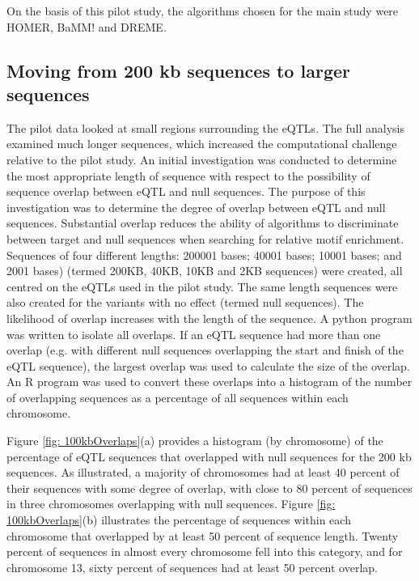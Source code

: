 \documentclass[12pt]{article}
\begin{document}
On the basis of this pilot study, the algorithms chosen for the main study were HOMER, BaMM! and DREME.


\subsection{Moving from 200 kb sequences to larger sequences}

The pilot data looked at small regions surrounding the eQTLs. The full analysis examined much longer sequences, which increased the computational challenge relative to the pilot study.  An initial investigation was conducted to determine the most appropriate length of sequence with respect to the possibility of sequence overlap between eQTL and null sequences. The purpose of this investigation was to determine the degree of overlap between eQTL and null sequences. Substantial overlap reduces the ability of algorithms to discriminate between target and null sequences when searching for relative motif enrichment. Sequences of four different lengths: 200001 bases; 40001 bases; 10001 bases; and 2001 bases) (termed 200KB, 40KB, 10KB and 2KB sequences) were created, all centred on the eQTLs used in the pilot study. The same length sequences were also created for the variants with no effect (termed null sequences). The likelihood of overlap increases with the length of the sequence. A python program was written to isolate all overlaps. If an eQTL sequence had more than one overlap (e.g. with different null sequences overlapping the start and finish of the eQTL sequence), the largest overlap was used to calculate the size of the overlap. An R program was used to convert these overlaps into a histogram of the number of overlapping sequences as a percentage of all sequences within each chromosome.

Figure \ref{fig: 100kbOverlaps}(a) provides a histogram (by chromosome) of the percentage of eQTL sequences that overlapped with null sequences for the 200 kb sequences. As illustrated, a majority of chromosomes had at least 40 percent of their sequences with some degree of overlap, with close to 80 percent of sequences in three chromosomes overlapping with null sequences. Figure \ref{fig: 100kbOverlaps}(b) illustrates the percentage of sequences within each chromosome that overlapped by at least 50 percent of sequence length. Twenty percent of sequences in almost every chromosome fell into this category, and for chromosome 13, sixty percent of sequences had at least 50 percent overlap.
\end{document}
